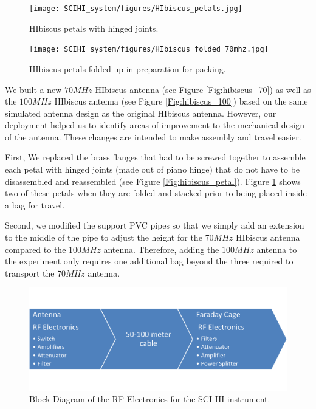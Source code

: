\begin{figure}[htb]
\centering
\begin{minipage}[b]{0.33\textwidth}
\centering
\texttt{[image: SCIHI\_system/figures/HIbiscus\_petals.jpg]}
\caption{HIbiscus petals with hinged joints.}
\label{Fig:hibiscus_petal}
\end{minipage}%
\begin{minipage}[b]{0.02\textwidth}
\hspace{1cm}
\end{minipage}%
\begin{minipage}[b]{0.61\textwidth}
\centering
\texttt{[image: SCIHI\_system/figures/HIbiscus\_folded\_70mhz.jpg]}
\caption{HIbiscus petals folded up in preparation for packing.}
\label{Fig:hibiscus_fold}
\end{minipage}
\end{figure}

We built a new $70 MHz$ HIbiscus antenna (see Figure \ref{Fig:hibiscus_70}) as well as the $100 MHz$ HIbiscus antenna (see Figure \ref{Fig:hibiscus_100}) based on the same simulated antenna design as the original HIbiscus antenna. However, our deployment helped us to identify areas of improvement to the mechanical design of the antenna. These changes are intended to make assembly and travel easier. 

First, We replaced the brass flanges that had to be screwed together to assemble each petal with hinged joints (made out of piano hinge) that do not have to be disassembled and reassembled (see Figure \ref{Fig:hibiscus_petal}). Figure \ref{Fig:hibiscus_fold} shows two of these petals when they are folded and stacked prior to being placed inside a bag for travel. 

Second, we modified the support PVC pipes so that we simply add an extension to the middle of the pipe to adjust the height for the $70 MHz$ HIbiscus antenna compared to the $100 MHz$ antenna. Therefore, adding the $100 MHz$ antenna to the experiment only requires one additional bag beyond the three required to transport the $70 MHz$ antenna. 

\begin{figure}[htb]
\begin{center}
\includegraphics[width=0.9\linewidth]{SCIHI_system/figures/rf_electronics_block_diagram.png}
\caption{Block Diagram of the RF Electronics for the SCI-HI instrument.}
\label{Fig:RF_block_diagram}
\end{center}
\end{figure}


